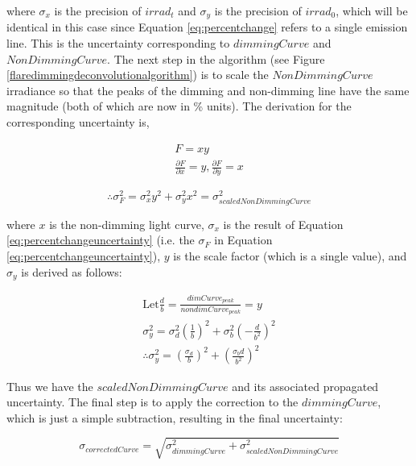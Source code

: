 \noindent where $\sigma _x$ is the precision of $irrad_t$ and $\sigma _y$ is the precision of $irrad_0$, which will be identical in this case since Equation \ref{eq:percentchange} refers to a single emission line. This is the uncertainty corresponding to $dimmingCurve$ and $NonDimmingCurve$. The next step in the algorithm (see Figure \ref{flaredimmingdeconvolutionalgorithm}) is to scale the $NonDimmingCurve$ irradiance so that the peaks of the dimming and non-dimming line have the same magnitude (both of which are now in \% units). The derivation for the corresponding uncertainty is, 

\begin{gather*}
    F = xy \\
    \frac{\partial F}{\partial x} = y , \frac{\partial F}{\partial y} = x
    \label{eq:scaledbrightcurvederivation}
\end{gather*}

\begin{equation}
    \therefore \sigma^2_F = \sigma^2_x y^2 + \sigma^2_y x^2 = \sigma^2_{scaledNonDimmingCurve}
    \label{eq:scaledbrightcurvestep1}
\end{equation}

\noindent where $x$ is the non-dimming light curve, $\sigma _x$ is the result of Equation \ref{eq:percentchangeuncertainty} (i.e. the $\sigma _F$ in Equation \ref{eq:percentchangeuncertainty}), $y$ is the scale factor (which is a single value), and $\sigma _y$ is derived as follows: 

\begin{gather*}
    \text{Let} \frac{d}{b} = \frac{dimCurve_{peak}}{nondimCurve_{peak}} = y \\
    \sigma^2_y = \sigma^2_d(\frac{1}{b})^2 + \sigma^2_b(-\frac{d}{b^2})^2 \\
    \therefore \sigma^2_y = (\frac{\sigma _d}{b})^2 + (\frac{\sigma _bd}{b^2})^2
    \label{eq:scalefactoruncertainty}
\end{gather*}

Thus we have the $scaledNonDimmingCurve$ and its associated propagated uncertainty. The final step is to apply the correction to the $dimmingCurve$, which is just a simple subtraction, resulting in the final uncertainty: 

\begin{equation}
    \sigma _{correctedCurve} = \sqrt{\sigma^2_{dimmingCurve} + \sigma^2_{scaledNonDimmingCurve}}
    \label{eq:correctedcurveuncertainty}
\end{equation}

